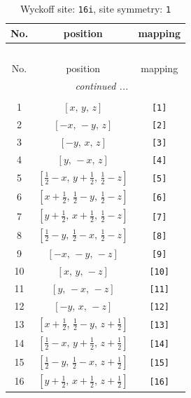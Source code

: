 \documentclass[fleqn,8pt]{jsarticle}
\begin{document}
\begin{longtable}{ccc}
\caption{Wyckoff site: {\tt 16i}, site symmetry: {\tt 1}}
 \\
 \hline \hline
No. & position & mapping \\ \hline \endfirsthead

\multicolumn{2}{l}{\tablename\ \thetable{}} \\
 \hline \hline
No. & position & mapping \\ \hline \endhead

 \hline \hline
\multicolumn{2}{r}{\footnotesize\it continued ...} \\ \endfoot

 \hline \hline
\multicolumn{2}{r}{} \\ \endlastfoot

1 & $\left[ x,\, y,\, z \right]$ & {\tt [1]} \\ \hline
2 & $\left[ - x,\, - y,\, z \right]$ & {\tt [2]} \\ \hline
3 & $\left[ - y,\, x,\, z \right]$ & {\tt [3]} \\ \hline
4 & $\left[ y,\, - x,\, z \right]$ & {\tt [4]} \\ \hline
5 & $\left[ \frac{1}{2} - x,\, y + \frac{1}{2},\, \frac{1}{2} - z \right]$ & {\tt [5]} \\ \hline
6 & $\left[ x + \frac{1}{2},\, \frac{1}{2} - y,\, \frac{1}{2} - z \right]$ & {\tt [6]} \\ \hline
7 & $\left[ y + \frac{1}{2},\, x + \frac{1}{2},\, \frac{1}{2} - z \right]$ & {\tt [7]} \\ \hline
8 & $\left[ \frac{1}{2} - y,\, \frac{1}{2} - x,\, \frac{1}{2} - z \right]$ & {\tt [8]} \\ \hline
9 & $\left[ - x,\, - y,\, - z \right]$ & {\tt [9]} \\ \hline
10 & $\left[ x,\, y,\, - z \right]$ & {\tt [10]} \\ \hline
11 & $\left[ y,\, - x,\, - z \right]$ & {\tt [11]} \\ \hline
12 & $\left[ - y,\, x,\, - z \right]$ & {\tt [12]} \\ \hline
13 & $\left[ x + \frac{1}{2},\, \frac{1}{2} - y,\, z + \frac{1}{2} \right]$ & {\tt [13]} \\ \hline
14 & $\left[ \frac{1}{2} - x,\, y + \frac{1}{2},\, z + \frac{1}{2} \right]$ & {\tt [14]} \\ \hline
15 & $\left[ \frac{1}{2} - y,\, \frac{1}{2} - x,\, z + \frac{1}{2} \right]$ & {\tt [15]} \\ \hline
16 & $\left[ y + \frac{1}{2},\, x + \frac{1}{2},\, z + \frac{1}{2} \right]$ & {\tt [16]} \\
\end{longtable}
\end{document}
